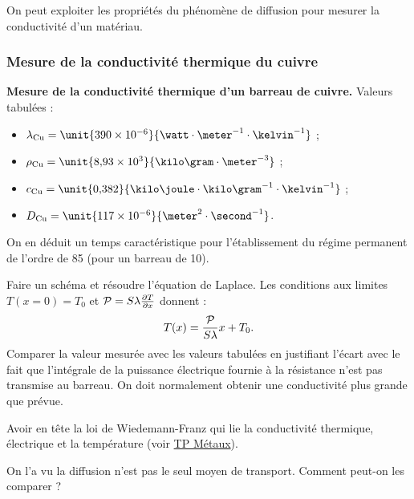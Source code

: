 \begin{transition}
On peut exploiter les propriétés du phénomène de diffusion pour mesurer la conductivité d'un matériau.
\end{transition}

\subsubsection{Mesure de la conductivité thermique du cuivre}

\begin{experience}
\textbf{Mesure de la conductivité thermique d'un barreau de cuivre.}
Valeurs tabulées : 
\begin{itemize}
\item $\lambda_\mathrm{Cu}=\unit{390\times 10^{-6}}{\watt\cdot\meter^{-1}\cdot\kelvin^{-1}}$ ;
\item $\rho_\mathrm{Cu} = \unit{8{,}93\times10^3}{\kilo\gram\cdot\meter^{-3}}$ ;
\item $c_\mathrm{Cu} = \unit{0{,}382}{\kilo\joule\cdot\kilo\gram^{-1}\cdot\kelvin^{-1}}$ ;
\item $D_\mathrm{Cu} = \unit{117\times10^{-6}}{\meter^2\cdot\second^{-1}}$.  
\end{itemize}
On en déduit un temps caractéristique pour l'établissement du régime permanent de l'ordre de \unit{85}{\second} (pour un barreau de \unit{10}{\centi\meter}).
\end{experience}

Faire un schéma et résoudre l'équation de Laplace.
Les conditions aux limites $T(x=0)=T_0$ et ${\cal{P}}=S\lambda\frac{\partial T}{\partial x}$ donnent :
\begin{equation}
T(x) = \frac{\cal{P}}{S\lambda} x + T_0.
\end{equation}
Comparer la valeur mesurée avec les valeurs tabulées en justifiant l'écart avec le fait que l'intégrale de la puissance électrique fournie à la résistance n'est pas transmise au barreau.
On doit normalement obtenir une conductivité plus grande que prévue.

\begin{remarque}
Avoir en tête la loi de Wiedemann-Franz qui lie la conductivité thermique, électrique et la température (voir \href{http://ressources.agreg.phys.ens.fr/ressources/}{TP Métaux}).
\end{remarque}

\begin{transition}
On l'a vu la diffusion n'est pas le seul moyen de transport.
Comment peut-on les comparer ?
\end{transition}

